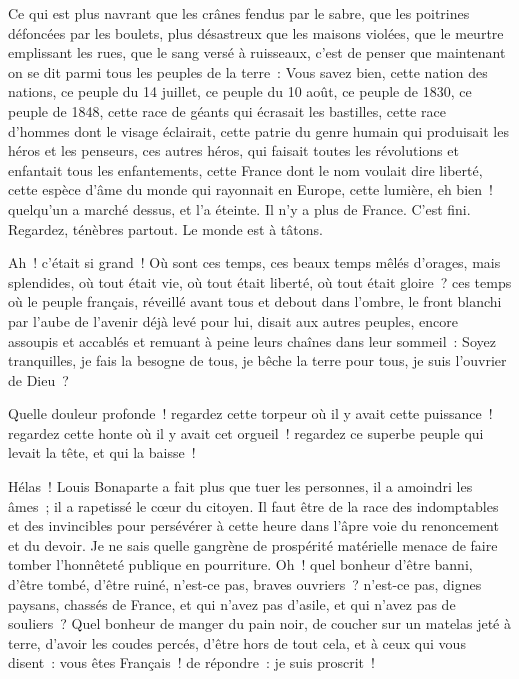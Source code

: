 \documentclass[french,twoside]{book} %
\begin{document}
Ce qui est plus navrant que les crânes fendus par le sabre, que les poitrines défoncées par les boulets, plus désastreux que les maisons violées, que le meurtre emplissant les rues, que le sang versé à ruisseaux, c’est de penser que maintenant on se dit parmi tous les peuples de la terre : Vous savez bien, cette nation des nations, ce peuple du 14 juillet, ce peuple du 10 août, ce peuple de 1830, ce peuple de 1848, cette race de géants qui écrasait les bastilles, cette race d’hommes dont le visage éclairait, cette patrie du genre humain qui produisait les héros et les penseurs, ces autres héros, qui faisait toutes les révolutions et enfantait tous les enfantements, cette France dont le nom voulait dire liberté, cette espèce d’âme du monde qui rayonnait en Europe, cette lumière, eh bien ! quelqu’un a marché dessus, et l’a éteinte. Il n’y a plus de France. C’est fini. Regardez, ténèbres partout. Le monde est à tâtons.\par
Ah ! c’était si grand ! Où sont ces temps, ces beaux temps mêlés d’orages, mais splendides, où tout était vie, où tout était liberté, où tout était gloire ? ces temps où le peuple français, réveillé avant tous et debout dans l’ombre, le front blanchi par l’aube de l’avenir déjà levé pour lui, disait aux autres peuples, encore assoupis et accablés et remuant à peine leurs chaînes dans leur sommeil : Soyez tranquilles, je fais la besogne de tous, je bêche la terre pour tous, je suis l’ouvrier de Dieu ?\par
Quelle douleur profonde ! regardez cette torpeur où il y avait cette puissance ! regardez cette honte où il y avait cet orgueil ! regardez ce superbe peuple qui levait la tête, et qui la baisse !\par
Hélas ! Louis Bonaparte a fait plus que tuer les personnes, il a amoindri les âmes ; il a rapetissé le cœur du citoyen. Il faut être de la race des indomptables et des invincibles pour persévérer à cette heure dans l’âpre voie du renoncement et du devoir. Je ne sais quelle gangrène de prospérité matérielle menace de faire tomber l’honnêteté publique en pourriture. Oh ! quel bonheur d’être banni, d’être tombé, d’être ruiné, n’est-ce pas, braves ouvriers ? n’est-ce pas, dignes paysans, chassés de France, et qui n’avez pas d’asile, et qui n’avez pas de souliers ? Quel bonheur de manger du pain noir, de coucher sur un matelas jeté à terre, d’avoir les coudes percés, d’être hors de tout cela, et à ceux qui vous disent : vous êtes Français ! de répondre : je suis proscrit !\par
\end{document}
